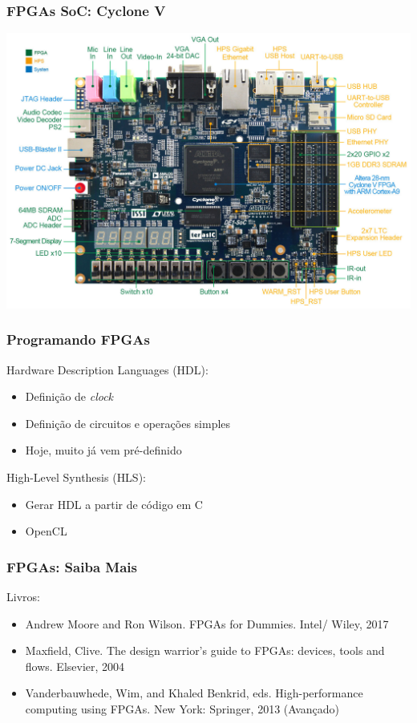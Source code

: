 \documentclass[10pt, compress]{beamer}
\begin{document}
\begin{frame}
    \frametitle{FPGAs SoC: Cyclone V}
    \begin{center}
        \includegraphics[width=\textwidth]{cycloneV}
    \end{center}
\end{frame}

\begin{frame}
    \frametitle{Programando FPGAs}
    Hardware Description Languages (\alert{HDL}):
    \begin{itemize}
        \item Definição de \textit{clock}
        \item Definição de circuitos e operações simples
        \item Hoje, muito já vem pré-definido
    \end{itemize}

    \pause

    High-Level Synthesis (\alert{HLS}):
    \begin{itemize}
        \item Gerar HDL a partir de \alert{código em C}
        \item \alert{OpenCL}
    \end{itemize}
\end{frame}

\begin{frame}
    \frametitle{FPGAs: Saiba Mais}
    Livros:

    \begin{itemize}
        \item Andrew Moore and Ron Wilson. FPGAs for Dummies. Intel/ Wiley, 2017
        \item Maxfield, Clive. The design warrior's guide to FPGAs: devices, tools and flows. Elsevier, 2004
        \item Vanderbauwhede, Wim, and Khaled Benkrid, eds. High-performance computing using FPGAs. New York: Springer, 2013 (Avançado)
    \end{itemize}
\end{frame}
\end{document}
